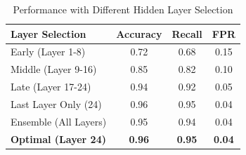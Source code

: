 
\begin{table}[h]
\centering
\caption{Performance with Different Hidden Layer Selection}
\label{tab:layer_selection}
\begin{tabular}{lccc}
\toprule
\textbf{Layer Selection} & \textbf{Accuracy} & \textbf{Recall} & \textbf{FPR} \\
\midrule
Early (Layer 1-8) & 0.72 & 0.68 & 0.15 \\
Middle (Layer 9-16) & 0.85 & 0.82 & 0.10 \\
Late (Layer 17-24) & 0.94 & 0.92 & 0.05 \\
\midrule
Last Layer Only (24) & 0.96 & 0.95 & 0.04 \\
Ensemble (All Layers) & 0.95 & 0.94 & 0.04 \\
\textbf{Optimal (Layer 24)} & \textbf{0.96} & \textbf{0.95} & \textbf{0.04} \\
\bottomrule
\end{tabular}
\end{table}
